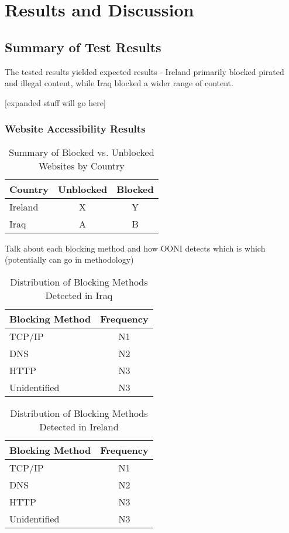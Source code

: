 \chapter{Results and Discussion}

\section{Summary of Test Results}

The tested results yielded expected results - Ireland primarily blocked pirated and illegal content, while Iraq blocked a wider range of content.

[expanded stuff will go here]

\subsection{Website Accessibility Results}

\begin{table}[H]
\centering
\caption{Summary of Blocked vs. Unblocked Websites by Country}
\begin{tabular}{lcc}
\toprule
\textbf{Country} & \textbf{Unblocked} & \textbf{Blocked} \\
\midrule
Ireland & X & Y \\
Iraq    & A & B \\
\bottomrule
\end{tabular}
\label{tab:blocked_summary}
\end{table}

Talk about each blocking method and how OONI detects which is which (potentially can go in methodology)

\begin{table}[H]
\centering
\caption{Distribution of Blocking Methods Detected in Iraq}
\begin{tabular}{lc}
\toprule
\textbf{Blocking Method} & \textbf{Frequency} \\
\midrule
TCP/IP          & N1 \\
DNS & N2 \\
HTTP & N3 \\
Unidentified & N3 \\
\bottomrule
\end{tabular}
\label{tab:iraq_blocking_methods}
\end{table}

\begin{table}[H]
\centering
\caption{Distribution of Blocking Methods Detected in Ireland}
\begin{tabular}{lc}
\toprule
\textbf{Blocking Method} & \textbf{Frequency} \\
\midrule
TCP/IP          & N1 \\
DNS & N2 \\
HTTP & N3 \\
Unidentified & N3 \\
\bottomrule
\end{tabular}
\label{tab:ireland_blocking_methods}
\end{table}


